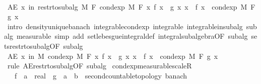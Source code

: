 \begin{isabellebody}
\isanewline
\ \ \isacommand{{\isacharbraceright}{\kern0pt}}\isamarkupfalse%
\isanewline
\ \ \isamarkupfalse%
\ {\isachardoublequoteopen}AE\ x\ in\ restr{\isacharunderscore}{\kern0pt}to{\isacharunderscore}{\kern0pt}subalg\ M\ F{\isachardot}{\kern0pt}\ cond{\isacharunderscore}{\kern0pt}exp\ M\ F\ {\isacharparenleft}{\kern0pt}{\isasymlambda}x{\isachardot}{\kern0pt}\ f\ x\ {\isacharasterisk}{\kern0pt}\ g\ x{\isacharparenright}{\kern0pt}\ x\ {\isacharequal}{\kern0pt}\ f\ x\ {\isacharasterisk}{\kern0pt}\ cond{\isacharunderscore}{\kern0pt}exp\ M\ F\ g\ x{\isachardoublequoteclose}\ \isamarkupfalse%
\ {\isacharparenleft}{\kern0pt}intro\ density{\isacharunderscore}{\kern0pt}unique{\isacharunderscore}{\kern0pt}banach\ integrable{\isacharunderscore}{\kern0pt}cond{\isacharunderscore}{\kern0pt}exp\ integrable\ integrable{\isacharunderscore}{\kern0pt}in{\isacharunderscore}{\kern0pt}subalg\ subalg{\isacharcomma}{\kern0pt}\ measurable{\isacharcomma}{\kern0pt}\ simp\ add{\isacharcolon}{\kern0pt}\ set{\isacharunderscore}{\kern0pt}lebesgue{\isacharunderscore}{\kern0pt}integral{\isacharunderscore}{\kern0pt}def\ integral{\isacharunderscore}{\kern0pt}subalgebra{}{\isacharbrackleft}{\kern0pt}OF\ subalg{\isacharbrackright}{\kern0pt}\ sets{\isacharunderscore}{\kern0pt}restr{\isacharunderscore}{\kern0pt}to{\isacharunderscore}{\kern0pt}subalg{\isacharbrackleft}{\kern0pt}OF\ subalg{\isacharbrackright}{\kern0pt}{\isacharparenright}{\kern0pt}\isanewline
\ \ \isamarkupfalse%
\ {\isachardoublequoteopen}AE\ x\ in\ M{\isachardot}{\kern0pt}\ cond{\isacharunderscore}{\kern0pt}exp\ M\ F\ {\isacharparenleft}{\kern0pt}{\isasymlambda}x{\isachardot}{\kern0pt}\ f\ x\ {\isacharasterisk}{\kern0pt}\ g\ x{\isacharparenright}{\kern0pt}\ x\ {\isacharequal}{\kern0pt}\ f\ x\ {\isacharasterisk}{\kern0pt}\ cond{\isacharunderscore}{\kern0pt}exp\ M\ F\ g\ x{\isachardoublequoteclose}\ \isamarkupfalse%
\ {\isacharparenleft}{\kern0pt}rule\ AE{\isacharunderscore}{\kern0pt}restr{\isacharunderscore}{\kern0pt}to{\isacharunderscore}{\kern0pt}subalg{\isacharbrackleft}{\kern0pt}OF\ subalg{\isacharbrackright}{\kern0pt}{\isacharparenright}{\kern0pt}\isanewline
{}\isamarkupfalse%
%
\endisatagproof
{\isafoldproof}%
%
\isadelimproof
\isanewline
%
\endisadelimproof
\isanewline
{}\isamarkupfalse%
\ cond{\isacharunderscore}{\kern0pt}exp{\isacharunderscore}{\kern0pt}measurable{\isacharunderscore}{\kern0pt}scaleR{\isacharcolon}{\kern0pt}\isanewline
\ \ \ f\ {\isacharcolon}{\kern0pt}{\isacharcolon}{\kern0pt}\ {\isachardoublequoteopen}{\isacharprime}{\kern0pt}a\ {\isasymRightarrow}\ real{\isachardoublequoteclose}\ \ g\ {\isacharcolon}{\kern0pt}{\isacharcolon}{\kern0pt}\ {\isachardoublequoteopen}{\isacharprime}{\kern0pt}a\ {\isasymRightarrow}\ {\isacharprime}{\kern0pt}b\ {\isacharcolon}{\kern0pt}{\isacharcolon}{\kern0pt}\ {\isacharbraceleft}{\kern0pt}second{\isacharunderscore}{\kern0pt}countable{\isacharunderscore}{\kern0pt}topology{\isacharcomma}{\kern0pt}\ banach{\isacharbraceright}{\kern0pt}{\isachardoublequoteclose}\isanewline

\end{isabellebody}
